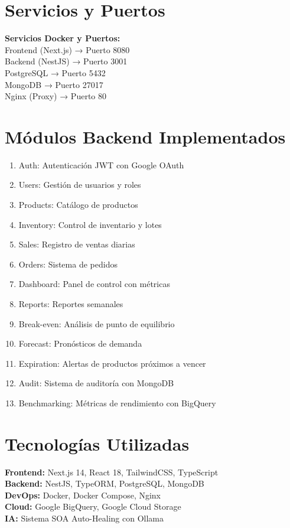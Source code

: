 \documentclass[12pt,a4paper]{article}
\begin{document}
\section{Servicios y Puertos}
\textbf{Servicios Docker y Puertos:} \\
Frontend (Next.js) → Puerto 8080 \\
Backend (NestJS) → Puerto 3001 \\
PostgreSQL → Puerto 5432 \\
MongoDB → Puerto 27017 \\
Nginx (Proxy) → Puerto 80

\section{M\'odulos Backend Implementados}
\begin{enumerate}
\item Auth: Autenticaci\'on JWT con Google OAuth
\item Users: Gesti\'on de usuarios y roles
\item Products: Cat\'alogo de productos
\item Inventory: Control de inventario y lotes
\item Sales: Registro de ventas diarias
\item Orders: Sistema de pedidos
\item Dashboard: Panel de control con m\'etricas
\item Reports: Reportes semanales
\item Break-even: An\'alisis de punto de equilibrio
\item Forecast: Pron\'osticos de demanda
\item Expiration: Alertas de productos pr\'oximos a vencer
\item Audit: Sistema de auditor\'ia con MongoDB
\item Benchmarking: M\'etricas de rendimiento con BigQuery
\end{enumerate}

\section{Tecnolog\'ias Utilizadas}
\textbf{Frontend:} Next.js 14, React 18, TailwindCSS, TypeScript \\
\textbf{Backend:} NestJS, TypeORM, PostgreSQL, MongoDB \\
\textbf{DevOps:} Docker, Docker Compose, Nginx \\
\textbf{Cloud:} Google BigQuery, Google Cloud Storage \\
\textbf{IA:} Sistema SOA Auto-Healing con Ollama
\end{document}

